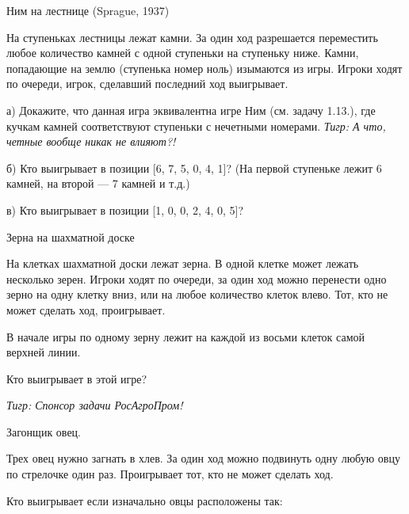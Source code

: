 \begin{problem}
 Ним на лестнице (Sprague, 1937)\par
На ступеньках лестницы лежат камни. За один ход разрешается переместить любое количество камней с одной ступеньки на ступеньку ниже. Камни, попадающие на землю (ступенька номер ноль) изымаются из игры. Игроки ходят по очереди, игрок, сделавший последний ход выигрывает.\par
а)	Докажите, что данная игра эквивалентна игре Ним (см. задачу 1.13.), где кучкам камней соответствуют ступеньки с нечетными номерами. {\it Тигр: А что, четные вообще никак не влияют?!}\par
б)	Кто выигрывает в позиции [6, 7, 5, 0, 4, 1]? (На первой ступеньке лежит 6 камней, на второй — 7 камней и т.д.)\par
в)	Кто выигрывает в позиции [1, 0, 0, 2, 4, 0, 5]?\par



\begin{sol}

\end{sol}
\end{problem}



\begin{problem}
 Зерна на шахматной доске\par
На клетках шахматной доски лежат зерна. В одной клетке может лежать несколько зерен. Игроки ходят по очереди, за один ход можно перенести одно зерно на одну клетку вниз, или на любое количество клеток влево. Тот, кто не может сделать ход, проигрывает.\par
В начале игры по одному зерну лежит на каждой из восьми клеток самой верхней линии.\par
Кто выигрывает в этой игре?\par
{\it Тигр: Спонсор задачи РосАгроПром!}



\begin{sol}

\end{sol}
\end{problem}




\begin{problem}
Загонщик овец.\par
Трех овец нужно загнать в хлев. За один ход можно подвинуть одну любую овцу по стрелочке один раз. Проигрывает тот, кто не может сделать ход. \par
Кто выигрывает если изначально овцы расположены так:






\begin{sol}

\end{sol}
\end{problem}




